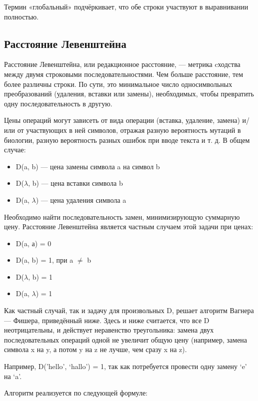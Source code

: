 Термин «глобальный» подчёркивает, что обе строки участвуют в выравнивании полностью.\cite{gasfild}

\subsection{Расстояние Левенштейна}

\hspace{1.25cm}
Расстояние Левенштейна, или редакционное расстояние, — метрика cходства между двумя строковыми последовательностями. Чем больше расстояние, тем более различны строки. По сути, это минимальное число односимвольных преобразований (удаления, вставки или замены), необходимых, чтобы превратить одну последовательность в другую.

Цены операций могут зависеть от вида операции (вставка, удаление, замена) и/или от участвующих в ней символов, отражая разную вероятность мутаций в биологии, разную вероятность разных ошибок при вводе текста и т. д. В общем случае:

\begin{itemize}
\item D(a, b) — цена замены символа a на символ b
\item D($\lambda$, b) — цена вставки символа b
\item D(a, $\lambda$) — цена удаления символа a
\end{itemize}

Необходимо найти последовательность замен, минимизирующую суммарную цену. Расстояние Левенштейна является частным случаем этой задачи при ценах:

\begin{itemize}
\item D(a, а) = 0
\item D(a, b) = 1, при a $\neq$ b
\item D($\lambda$, b) = 1
\item D(a, $\lambda$) = 1
\end{itemize}

Как частный случай, так и задачу для произвольных D, решает алгоритм Вагнера — Фишера, приведённый ниже. Здесь и ниже считается, что все D неотрицательны, и действует неравенство треугольника: замена двух последовательных операций одной не увеличит общую цену (например, замена символа x на y, а потом y на z не лучше, чем сразу x на z).

Например, D(’hello’, ‘hallo’) = 1, так как потребуется провести одну замену ‘e’ на ‘a’.

Алгоритм реализуется по следующей формуле:

